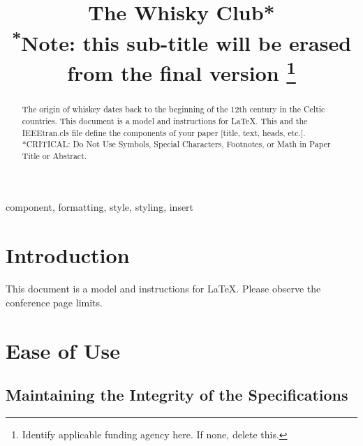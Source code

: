 \documentclass[conference]{IEEEtran}
\begin{document}
	
	\title{The Whisky Club*\\
		{\footnotesize \textsuperscript{*}Note: this sub-title will be erased from the final version}
		\thanks{Identify applicable funding agency here. If none, delete this.}
	}
	
	\author{
		\and
		
	}
	
	\maketitle
	
	\begin{abstract}
		The origin of whiskey dates back to the beginning of the 12th century in the Celtic countries.
		This document is a model and instructions for \LaTeX.
		This and the IEEEtran.cls file define the components of your paper [title, text, heads, etc.]. *CRITICAL: Do Not Use Symbols, Special Characters, Footnotes, 
		or Math in Paper Title or Abstract.
	\end{abstract}
	
	\begin{IEEEkeywords}
		component, formatting, style, styling, insert
	\end{IEEEkeywords}
	
	\section{Introduction}
	This document is a model and instructions for \LaTeX.
	Please observe the conference page limits. 
	
	\section{Ease of Use}
	
	\subsection{Maintaining the Integrity of the Specifications}
	
\end{document}
